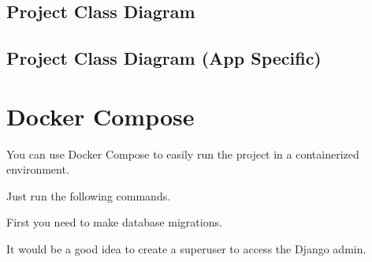 \documentclass[letterpaper,10pt,english]{sphinxmanual}
\begin{document}
\section{Project Class Diagram}
\label{\detokenize{modules/diagrams:project-class-diagram}}


\section{Project Class Diagram (App Specific)}
\label{\detokenize{modules/diagrams:project-class-diagram-app-specific}}

\sphinxstepscope


\chapter{Docker Compose}
\label{\detokenize{modules/docker:docker-compose}}\label{\detokenize{modules/docker::doc}}
\sphinxAtStartPar
You can use Docker Compose to easily run the project in a containerized environment.

\sphinxAtStartPar
Just run the following commands.

\sphinxAtStartPar
First you need to make database migrations.

\begin{sphinxVerbatim}[commandchars=\\\{\}]
\end{sphinxVerbatim}

\begin{sphinxVerbatim}[commandchars=\\\{\}]
\end{sphinxVerbatim}

\sphinxAtStartPar
It would be a good idea to create a superuser to access the Django admin.

\begin{sphinxVerbatim}[commandchars=\\\{\}]
\end{sphinxVerbatim}
\end{document}
